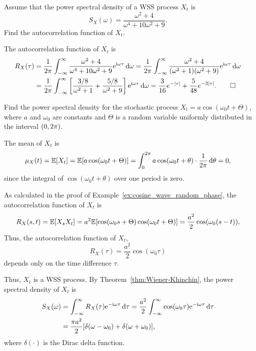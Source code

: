 \begin{example}
  Assume that the power spectral density of a WSS process \(X_t\) is
  \[
    S_X(\omega) = \frac{\omega^2 + 4}{\omega^4 + 10\omega^2 + 9}.
  \]
  Find the autocorrelation function of \(X_t\).
\end{example}
\begin{solution}
  The autocorrelation function of \(X_t\) is
  \begin{align*}
    R_X(\tau) &= \frac{1}{2\mathrm{\pi}} \int_{-\infty}^\infty \frac{\omega^2 + 4}{\omega^4 + 10\omega^2 + 9} \mathrm{e}^{\mathrm{i} \omega \tau} \, \mathrm{d}\omega = \frac{1}{2\mathrm{\pi}} \int_{-\infty}^\infty \frac{\omega^2 + 4}{(\omega^2 + 1)(\omega^2 + 9)} \mathrm{e}^{\mathrm{i} \omega \tau} \, \mathrm{d}\omega \\
    &= \frac{1}{2\mathrm{\pi}} \int_{-\infty}^\infty \left[\frac{3/8}{\omega^2 + 1} + \frac{5/8}{\omega^2 + 9}\right] \mathrm{e}^{\mathrm{i} \omega \tau} \, \mathrm{d}\omega = \frac{3}{16} e^{-|\tau|} + \frac{5}{48} e^{-3|\tau|}. \qedhere
  \end{align*}
\end{solution}

\begin{example}
  Find the power spectral density for the stochastic process \(X_t = a \cos(\omega_0 t + \Theta)\), where \(a\) and \(\omega_0\) are constants and \(\Theta\) is a random variable uniformly distributed in the interval \((0, 2\mathrm{\pi})\).
\end{example}
\begin{solution}
  The mean of \(X_t\) is
  \[
    \mu_X(t) = \mathbb{E}[X_t] = \mathbb{E}[a \cos(\omega_0 t + \Theta)] = \int_0^{2\mathrm{\pi}} a \cos(\omega_0 t + \theta) \cdot \frac{1}{2\mathrm{\pi}} \, \mathrm{d}\theta = 0,
  \]
  since the integral of \(\cos(\omega_0 t + \theta)\) over one period is zero.

  As calculated in the proof of Example~\ref{ex:cosine_wave_random_phase}, the autocorrelation function of \(X_t\) is
  \[
    R_X(s, t) = \mathbb{E}[X_s X_t] = a^2 \mathbb{E}[\cos(\omega_0 s + \Theta) \cos(\omega_0 t + \Theta)] = \frac{a^2}{2} \cos(\omega_0 (s - t)),
  \]
  Thus, the autocorrelation function of \(X_t\),
  \[
    R_X(\tau) = \frac{a^2}{2} \cos(\omega_0 \tau)
  \]
  depends only on the time difference \(\tau\).
  
  Thus, \(X_t\) is a WSS process. By Theorem~\ref{thm:Wiener-Khinchin}, the power spectral density of \(X_t\) is
  \begin{align*}
    S_X(\omega) &= \int_{-\infty}^\infty R_X(\tau) \mathrm{e}^{-\mathrm{i} \omega \tau} \, \mathrm{d}\tau = \frac{a^2}{2} \int_{-\infty}^\infty \cos(\omega_0 \tau) \mathrm{e}^{-\mathrm{i} \omega \tau} \, \mathrm{d}\tau \\
    &= \frac{\mathrm{\pi} a^2}{2} [\delta(\omega - \omega_0) + \delta(\omega + \omega_0)],
  \end{align*}
  where \(\delta(\cdot)\) is the Dirac delta function.
\end{solution}

